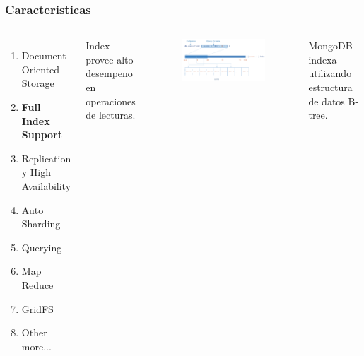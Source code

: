 \documentclass{beamer}
\begin{document}
\begin{frame}
\frametitle{Caracteristicas}
\begin{columns}[c] %

\begin{enumerate}
\item Document-Oriented Storage
\item \textbf{Full Index Support}
\item Replication y High Availability
\item Auto Sharding
\item Querying
\item Map Reduce
\item GridFS
\item Other more...
\end{enumerate}

Index provee alto desempeno en operaciones de lecturas.
\begin{figure}
\includegraphics[width=1\linewidth]{index-with-query.png}
\end{figure}
MongoDB indexa utilizando estructura de datos B-tree.
\end{columns}
\end{frame}
\end{document}
